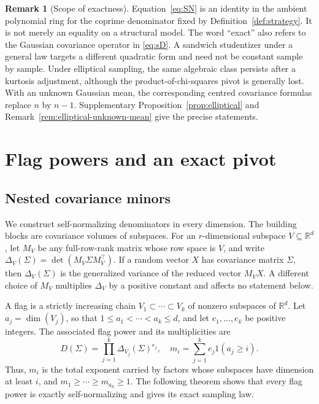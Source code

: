 \documentclass[12pt,a4paper]{article}
\theoremstyle{plain}
\theoremstyle{definition}
\newtheorem{remark}{Remark}
\newcommand{\R}{\mathbb{R}}
\newcommand{\ind}{\mathrm{1}}
\begin{document}
\begin{remark}[Scope of exactness]
    \label{rem:scope-exactness}
    Equation~\eqref{eq:SN} is an identity in the ambient polynomial ring for the coprime denominator fixed by Definition~\ref{def:strategy}.
    It is not merely an equality on a structural model.
    The word ``exact'' also refers to the Gaussian covariance operator in \eqref{eq:sD}.
    A sandwich studentizer under a general law targets a different quadratic form and need not be constant sample by sample.
    Under elliptical sampling, the same algebraic class persists after a kurtosis adjustment, although the product-of-chi-squares pivot is generally lost.
    With an unknown Gaussian mean, the corresponding centred covariance formulas replace $n$ by $n-1$.
    Supplementary Proposition~\ref{prop:elliptical} and Remark~\ref{rem:elliptical-unknown-mean} give the precise statements.
\end{remark}

\section{Flag powers and an exact pivot}
\label{sec:flag}

\subsection{Nested covariance minors}

We construct self-normalizing denominators in every dimension.
The building blocks are covariance volumes of subspaces.
For an $r$-dimensional subspace $V\subseteq\R^d$, let $M_V$ be any full-row-rank matrix whose row space is $V$, and write $\Delta_V(\Sigma)=\det(M_V\Sigma M_V^\top)$.
If a random vector $X$ has covariance matrix $\Sigma$, then $\Delta_V(\Sigma)$ is the generalized variance of the reduced vector $M_VX$.
A different choice of $M_V$ multiplies $\Delta_V$ by a positive constant and affects no statement below.

A flag is a strictly increasing chain $V_1\subset\cdots\subset V_k$ of nonzero subspaces of $\R^d$.
Let $a_j=\dim(V_j)$, so that $1\le a_1<\cdots<a_k\le d$, and let $e_1,\ldots,e_k$ be positive integers.
The associated flag power and its multiplicities are
\begin{equation}
\label{eq:flag-power}
    D(\Sigma)
    =
    \prod_{j=1}^k\Delta_{V_j}(\Sigma)^{e_j}
    ,\quad
    m_i
    =
    \sum_{j=1}^ke_j\ind(a_j\ge i)
    .
\end{equation}
Thus, $m_i$ is the total exponent carried by factors whose subspaces have dimension at least $i$, and $m_1\ge\cdots\ge m_{a_k}\ge1$.
The following theorem shows that every flag power is exactly self-normalizing and gives its exact sampling law.
\end{document}
